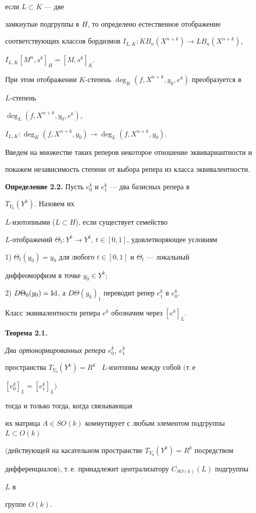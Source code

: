 если $L\subset K$ --- две 


замкнутые подгруппы в $H$, то определено естественное отображение 


соответствующих классов бордизмов $I_{L,K}:KB_n(X^{n+k})\to LB_n(X^{n+k})$, 


$I_{L,K}[M^n,s^k]_H=[M,s^k]_K$. 


При этом отображении $K$-степень $\deg_K(f,X^{n+k},y_0,e^k)$ преобразуется в 


$L$-степень 


$\deg_L(f,X^{n+k},y_0,e^k)$, 


$I_{L,K}:\deg_K(f,X^{n+k},y_0)\to\deg_L(f,X^{n+k},y_0)$. 


 


Введем на множестве таких реперов некоторое отношение эквивариантности и 


покажем независимость степени от выбора репера из класса эквивалентности. 


\medskip 


 


{\bf Определение 2.2.} Пусть $e^k_0$ и $e^k_1$ --- два базисных репера в 


$T_{Y_0}(Y^k)$. Назовем их 


$L$-изотопными ($L\subset H$), если существует семейство 


$L$-отображений $\Theta_t:Y^k\to Y^k$, $t\in[0,1]$, удовлетворяющее условиям 


 


1) $\Theta_t(y_0)=y_0$ для любого $t\in[0,1]$ и $\Theta_t$ --- локальный 


диффеоморфизм в точке $y_0\in Y^k$; 


 


2) $D\Theta_0(y_0)=\operatorname{Id}$, а $D\Theta(y_0)_1$ переводит репер $e^k_1$ в $e^k_0$. 


\medskip 


 


Класс эквивалентности репера $e^k$ обозначим через $[e^k]_L$. 


\medskip 


 


{\bf Теорема 2.1.} {\it Два ортонормированных репера $e^k_0$, $e^k_1$ 


пространства $T_{Y_0}(Y^k)=R^k$ \ $L$-изо\-топ\-ны между собой $($т.\,е 


$[e^k_0]_L=[e^k_1]_L)$ 


тогда и только тогда, когда связывающая 


их матрица $A\in SO(k)$ коммутирует с любым элементом подгруппы $L\subset 


O(k)$ 


$($действующей на касательном пространстве $T_{Y_0}(Y^k)=R^k$ посредством 


дифференциалов$)$, т.\,е. принадлежит централизатору $C_{SO(k)}(L)$ подгруппы 


$L$ в 


группе $O(k)$.} 


